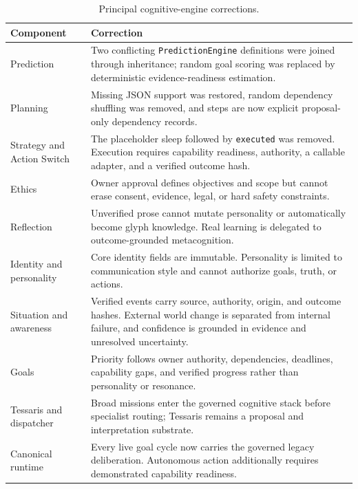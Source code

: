 \begin{table}[htbp]
\centering
\caption{Principal cognitive-engine corrections.}
\label{tab:aion-cognitive-engine-repairs}
\begin{tabularx}{\textwidth}{@{}>{\raggedright\arraybackslash}p{3.4cm}X@{}}
\toprule
Component & Correction \\
\midrule
Prediction & Two conflicting \texttt{PredictionEngine} definitions were joined
through inheritance; random goal scoring was replaced by deterministic
evidence-readiness estimation. \\
Planning & Missing JSON support was restored, random dependency shuffling was
removed, and steps are now explicit proposal-only dependency records. \\
Strategy and Action Switch & The placeholder sleep followed by
\texttt{executed} was removed.  Execution requires capability readiness,
authority, a callable adapter, and a verified outcome hash. \\
Ethics & Owner approval defines objectives and scope but cannot erase consent,
evidence, legal, or hard safety constraints. \\
Reflection & Unverified prose cannot mutate personality or automatically
become glyph knowledge.  Real learning is delegated to outcome-grounded
metacognition. \\
Identity and personality & Core identity fields are immutable.  Personality is
limited to communication style and cannot authorize goals, truth, or actions. \\
Situation and awareness & Verified events carry source, authority, origin, and
outcome hashes.  External world change is separated from internal failure, and
confidence is grounded in evidence and unresolved uncertainty. \\
Goals & Priority follows owner authority, dependencies, deadlines, capability
gaps, and verified progress rather than personality or resonance. \\
Tessaris and dispatcher & Broad missions enter the governed cognitive stack
before specialist routing; Tessaris remains a proposal and interpretation
substrate. \\
Canonical runtime & Every live goal cycle now carries the governed legacy
deliberation.  Autonomous action additionally requires demonstrated capability
readiness. \\
\bottomrule
\end{tabularx}
\end{table}


